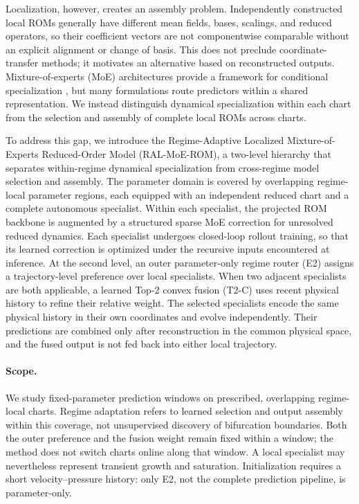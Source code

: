 Localization, however, creates an assembly problem. Independently constructed local ROMs generally have different mean fields, bases, scalings, and reduced operators, so their coefficient vectors are not componentwise comparable without an explicit alignment or change of basis. This does not preclude coordinate-transfer methods; it motivates an alternative based on reconstructed outputs. Mixture-of-experts (MoE) architectures provide a framework for conditional specialization \citep{jacobs1991,jordan1994,shazeer2017,fedus2022}, but many formulations route predictors within a shared representation. We instead distinguish dynamical specialization within each chart from the selection and assembly of complete local ROMs across charts.


To address this gap, we introduce the Regime-Adaptive Localized Mixture-of-Experts Reduced-Order Model (RAL-MoE-ROM), a two-level hierarchy that separates within-regime dynamical specialization from cross-regime model selection and assembly. The parameter domain is covered by overlapping regime-local parameter regions, each equipped with an independent reduced chart and a complete autonomous specialist. Within each specialist, the projected ROM backbone is augmented by a structured sparse MoE correction for unresolved reduced dynamics. Each specialist undergoes closed-loop rollout training, so that its learned correction is optimized under the recursive inputs encountered at inference. At the second level, an outer parameter-only regime router (E2) assigns a trajectory-level preference over local specialists. When two adjacent specialists are both applicable, a learned Top-2 convex fusion (T2-C) uses recent physical history to refine their relative weight. The selected specialists encode the same physical history in their own coordinates and evolve independently. Their predictions are combined only after reconstruction in the common physical space, and the fused output is not fed back into either local trajectory.


\paragraph{Scope.}
We study fixed-parameter prediction windows on prescribed, overlapping regime-local charts. Regime adaptation refers to learned selection and output assembly within this coverage, not unsupervised discovery of bifurcation boundaries. Both the outer preference and the fusion weight remain fixed within a window; the method does not switch charts online along that window. A local specialist may nevertheless represent transient growth and saturation. Initialization requires a short velocity--pressure history: only E2, not the complete prediction pipeline, is parameter-only.

